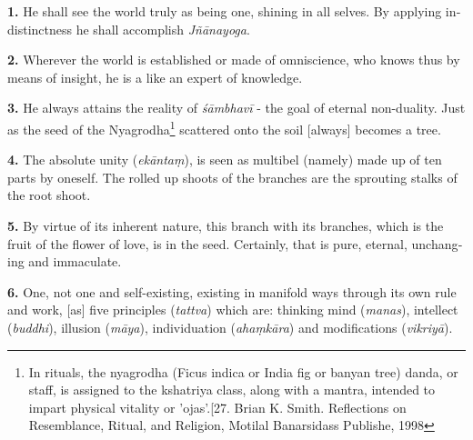 \begin{otherlanguage}{english}
\begin{tlate}
    \end{tlate}
    \begin{tlate}
  \textbf{1.} He shall see the world truly as being one, shining in all selves.
            By applying indistinctness he shall accomplish \textit{Jñānayoga}. \\
    \end{tlate}
    \begin{tlate}
      \textbf{2.} Wherever the world is established or made of omniscience,
            who knows thus by means of insight, he is a like an expert of knowledge. \\
    \end{tlate}
    \begin{tlate}
       \textbf{3.} He always attains the reality of \textit{śāmbhavī} - the goal of eternal non-duality.
            Just as the seed of the Nyagrodha\footnote{In rituals, the nyagrodha (Ficus indica or India fig or banyan tree) danda, or staff, is assigned to the kshatriya class, along with a mantra, intended to impart physical vitality or 'ojas'.[27. Brian K. Smith. Reflections on Resemblance, Ritual, and Religion, Motilal Banarsidass Publishe, 1998} scattered onto the soil [always] becomes a tree. \\
    \end{tlate}
    \begin{tlate}
        \textbf{4.} The absolute unity (\textit{ekāntaṃ}), is seen as multibel (namely) made up of ten parts by oneself.
            The rolled up shoots of the branches are the sprouting stalks of the root shoot. \\
          \end{tlate}
    \begin{tlate}
            \textbf{5.} By virtue of its inherent nature, this branch with its branches, which is the fruit of the flower of love, is in the seed.
            Certainly, that is pure, eternal, unchanging and immaculate. \\
          \end{tlate}
   \begin{tlate}
            \textbf{6.} One, not one and self-existing, existing in manifold ways through its own rule and work,
            [as] five principles (\textit{tattva}) which are: thinking mind (\textit{manas}), intellect (\textit{buddhi}), illusion (\textit{māya}), individuation (\textit{ahaṃkāra}) and modifications (\textit{vikriyā}). \\       

\end{tlate}
\end{otherlanguage}
